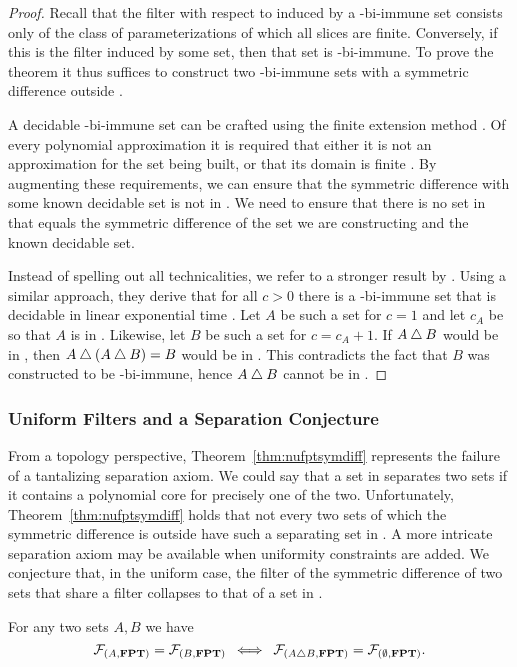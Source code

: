 \begin{proof}
  Recall that the filter with respect to  induced by a -bi-immune set consists only of the class of parameterizations of which all slices are finite.
  Conversely, if this is the filter induced by some set, then that set is -bi-immune.
  To prove the theorem it thus suffices to construct two -bi-immune sets with a symmetric difference outside .

  A decidable -bi-immune set can be crafted using the finite extension method \parencite{downey2010algorithmic}.
  Of every polynomial approximation it is required that either it is not an approximation for the set being built, or that its domain is finite \parencite{balcazar1990structural}.
  By augmenting these requirements, we can ensure that the symmetric difference with some known decidable set is not in .
  We need to ensure that there is no set in  that equals the symmetric difference of the set we are constructing and the known decidable set.

  Instead of spelling out all technicalities, we refer to a stronger result by \textcite{geske1991note}.
  Using a similar approach, they derive that for all $c > 0$ there is a -bi-immune set that is decidable in linear exponential time \parencite{mayordomo1994almost}.
  Let $A$ be such a set for $c = 1$ and let $c_A$ be so that $A$ is in .
  Likewise, let $B$ be such a set for $c = c_A + 1$.
  If $A \bigtriangleup B$ would be in , then $A \bigtriangleup (A \bigtriangleup B) = B$ would be in .
  This contradicts the fact that $B$ was constructed to be -bi-immune, hence $A \bigtriangleup B$ cannot be in .
\end{proof}

\subsubsection{Uniform Filters and a Separation Conjecture}
From a topology perspective, Theorem~\ref{thm:nufptsymdiff} represents the failure of a tantalizing separation axiom.
We could say that a set in  separates two sets if it contains a polynomial core for precisely one of the two.
Unfortunately, Theorem~\ref{thm:nufptsymdiff} holds that not every two sets of which the symmetric difference is outside  have such a separating set in .
A more intricate separation axiom may be available when uniformity constraints are added.
We conjecture that, in the uniform case, the filter of the symmetric difference of two sets that share a filter collapses to that of a set in .
\begin{conjecture}
\label{con:fptsymdiff}
  For any two sets $A, B$ we have
  \begin{equation*}
    \mathcal{F}_{(A, \textnormal{\textbf{FPT}})} = \mathcal{F}_{(B, \textnormal{\textbf{FPT}})} \:\iff\: \mathcal{F}_{(A \bigtriangleup B, \textnormal{\textbf{FPT}})} = \mathcal{F}_{(\emptyset, \textnormal{\textbf{FPT}})}.
  \end{equation*}
\end{conjecture}

